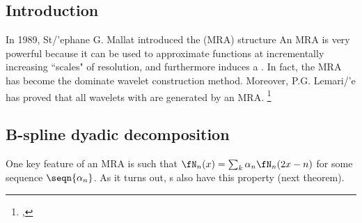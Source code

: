 \subsection{Introduction}
In 1989, St{/'e}phane G. Mallat introduced the  (MRA) structure 
An MRA is very powerful because it can be used to approximate functions at incrementally increasing ``scales" of 
resolution, and furthermore induces a .
In fact, the MRA has become the dominate wavelet construction method.
Moreover, P.G. Lemari{/'e} has proved that all wavelets with  are generated by an MRA.
\footnote{
  ,
  }

\subsection{B-spline dyadic decomposition}
One key feature of an MRA is  such that $\fN_n(x)=\sum_k \alpha_n\fN_n(2x-n)$ for some 
sequence $\seqn{\alpha_n}$.
As it turns out, s also have this property (next theorem).

